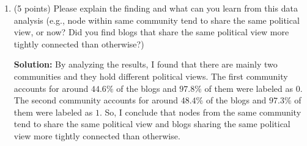 \documentclass[twoside,10pt]{article}
\begin{document}
\begin{enumerate}
\begin{tcolorbox}
\end{tcolorbox}

\item (5 points) Please explain the finding and what can you learn from this data analysis (e.g., node within same community tend to share the same political view, or now? Did you find blogs that share the same political view more tightly connected than otherwise?)
\begin{tcolorbox}
\textbf{Solution:} By analyzing the results, I found that there are mainly two communities and they hold different political views. The first community accounts for around $44.6 \%$ of the blogs and $97.8 \%$ of them were labeled as $0$. The second community accounts for around $48.4 \%$ of the blogs and $97.3 \%$ of them were labeled as $1$. So, I conclude that nodes from the same community tend to share the same political view and blogs sharing the same political view more tightly connected than otherwise.
\end{tcolorbox}

\end{enumerate}
\end{document}
